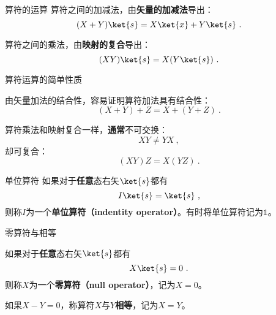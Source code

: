 \begin{definition}{算符的运算}\label{def_QMPrcp_8}
算符之间的加减法，由\textbf{矢量的加减法}导出：
\begin{equation}
(X+Y)\ket{s} = X\ket{x}+Y\ket{s}~.
\end{equation}

算符之间的乘法，由\textbf{映射的复合}导出：
\begin{equation}
(XY)\ket{s} = X(Y\ket{s})~.
\end{equation}
\end{definition}


\begin{theorem}{算符运算的简单性质}\label{the_QMPrcp_4}

由矢量加法的结合性，容易证明算符加法具有结合性：
\begin{equation}
(X+Y)+Z=X+(Y+Z)~.
\end{equation}

算符乘法和映射复合一样，\textbf{通常}不可交换：
\begin{equation}\label{eq_QMPrcp_6}
XY\neq YX~,
\end{equation}
却可复合：
\begin{equation}
(XY)Z=X(YZ)~.
\end{equation}


\end{theorem}

\begin{definition}{单位算符}\label{def_QMPrcp_9}
如果对于\textbf{任意}态右矢$\ket{s}$都有
\begin{equation}
I\ket{s} = \ket{s}~,
\end{equation}
则称$I$为一个\textbf{单位算符（indentity operator）}。有时将单位算符记为$\mathbb{1}$。
\end{definition}



\begin{definition}{零算符与相等}\label{def_QMPrcp_10}

如果对于\textbf{任意}态右矢$\ket{s}$都有
\begin{equation}
X\ket{s} = 0~.
\end{equation}
则称$X$为一个\textbf{零算符（null operator）}，记为$X=0$。

如果$X-Y=0$，称算符$X$与$Y$\textbf{相等}，记为$X=Y$。

\end{definition}







